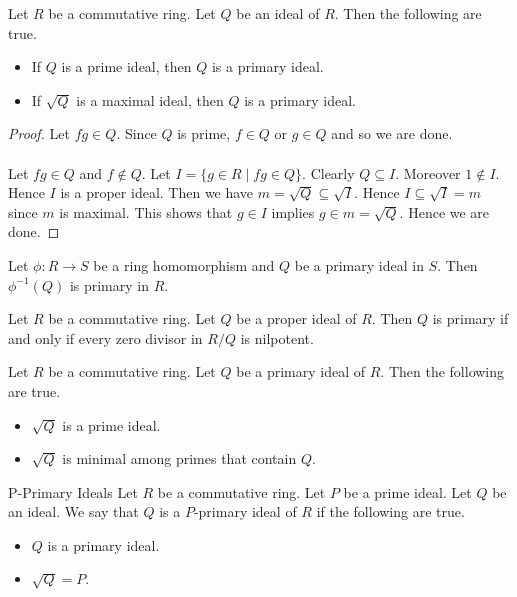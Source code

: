 \documentclass[a4paper]{article}
\begin{document}
\begin{lmm}{}{} Let $R$ be a commutative ring. Let $Q$ be an ideal of $R$. Then the following are true. 
\begin{itemize}
\item If $Q$ is a prime ideal, then $Q$ is a primary ideal. 
\item If $\sqrt{Q}$ is a maximal ideal, then $Q$ is a primary ideal. 
\end{itemize} \tcbline
\begin{proof}
Let $fg\in Q$. Since $Q$ is prime, $f\in Q$ or $g\in Q$ and so we are done. \\~\\

Let $fg\in Q$ and $f\notin Q$. Let $I=\{g\in R\;|\;fg\in Q\}$. Clearly $Q\subseteq I$. Moreover $1\notin I$. Hence $I$ is a proper ideal. Then we have $m=\sqrt{Q}\subseteq\sqrt{I}$. Hence $I\subseteq\sqrt{I}=m$ since $m$ is maximal. This shows that $g\in I$ implies $g\in m=\sqrt{Q}$. Hence we are done. 
\end{proof}
\end{lmm}

\begin{lmm}{}{} Let $\phi:R\to S$ be a ring homomorphism and $Q$ be a primary ideal in $S$. Then $\phi^{-1}(Q)$ is primary in $R$. 
\end{lmm}

\begin{prp}{}{} Let $R$ be a commutative ring. Let $Q$ be a proper ideal of $R$. Then $Q$ is primary if and only if every zero divisor in $R/Q$ is nilpotent. 
\end{prp}

\begin{lmm}{}{} Let $R$ be a commutative ring. Let $Q$ be a primary ideal of $R$. Then the following are true. 
\begin{itemize}
\item $\sqrt{Q}$ is a prime ideal. 
\item $\sqrt{Q}$ is minimal among primes that contain $Q$. 
\end{itemize}
\end{lmm}

\begin{defn}{P-Primary Ideals}{} Let $R$ be a commutative ring. Let $P$ be a prime ideal. Let $Q$ be an ideal. We say that $Q$ is a $P$-primary ideal of $R$ if the following are true. 
\begin{itemize}
\item $Q$ is a primary ideal. 
\item $\sqrt{Q}=P$. 
\end{itemize}
\end{defn}
\end{document}
